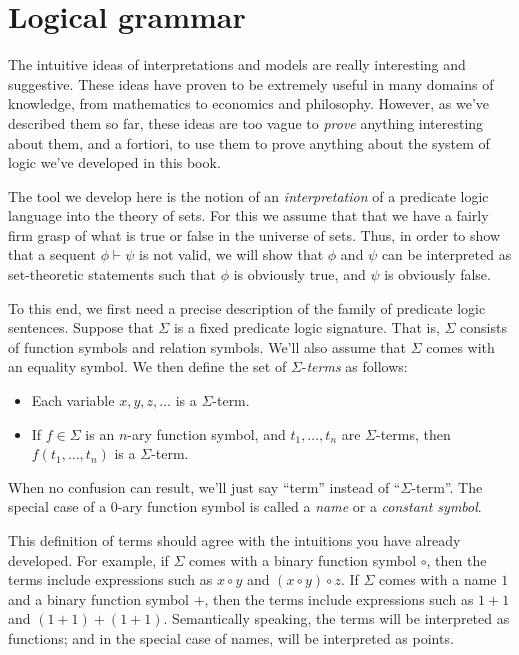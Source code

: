 \section{Logical grammar}

The intuitive ideas of interpretations and models are really
interesting and suggestive.  These ideas have proven to be extremely
useful in many domains of knowledge, from mathematics to economics and
philosophy.  However, as we've described them so far, these ideas are
too vague to {\it prove} anything interesting about them, and a
fortiori, to use them to prove anything about the system of logic
we've developed in this book.

The tool we develop here is the notion of an \emph{interpretation} of
a predicate logic language into the theory of sets.  For this we
assume that that we have a fairly firm grasp of what is true or false
in the universe of sets.  Thus, in order to show that a sequent
$\phi\vdash\psi$ is not valid, we will show that $\phi$ and $\psi$ can
be interpreted as set-theoretic statements such that $\phi$ is
obviously true, and $\psi$ is obviously false.

To this end, we first need a precise description of the family of
predicate logic sentences.  Suppose that $\Sigma$ is a fixed predicate
logic signature.  That is, $\Sigma$ consists of function symbols and
relation symbols.  We'll also assume that $\Sigma$ comes with an
equality symbol.  We then define the set of $\Sigma$-\emph{terms} as
follows:
\begin{itemize}
\item Each variable $x,y,z,\dots $ is a $\Sigma$-term.
\item If $f\in\Sigma$ is an $n$-ary function symbol, and
  $t_1,\dots ,t_n$ are $\Sigma$-terms, then $f(t_1,\dots ,t_n)$ is a
  $\Sigma$-term.
\end{itemize}
When no confusion can result, we'll just say ``term'' instead of
``$\Sigma$-term''.  The special case of a $0$-ary function symbol is
called a \emph{name} or a \emph{constant symbol}.

This definition of terms should agree with the intuitions you have
already developed.  For example, if $\Sigma$ comes with a binary
function symbol $\circ$, then the terms include expressions such as
$x\circ y$ and $(x\circ y)\circ z$.  If $\Sigma$ comes with a name $1$
and a binary function symbol $+$, then the terms include expressions
such as $1+1$ and $(1+1)+(1+1)$.  Semantically speaking, the terms
will be interpreted as functions; and in the special case of names,
will be interpreted as points.

